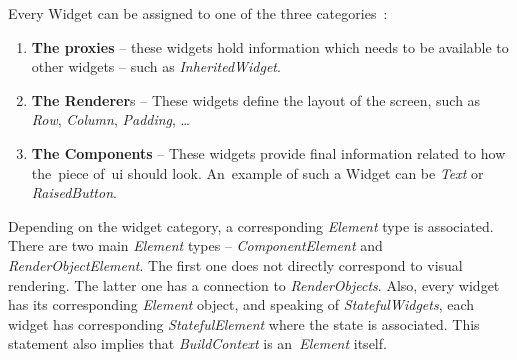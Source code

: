 Every Widget can be assigned to one of the three categories~\cite{didier-internals}:
\begin{enumerate}
\item \textbf{The proxies}  -- these widgets hold information which needs to be available to other widgets -- such as \textit{InheritedWidget}.
\item \textbf{The Renderer}s -- These widgets define the layout of the screen, such as \textit{Row}, \textit{Column}, \textit{Padding}, \ldots
\item \textbf{The Components} -- These widgets provide final information related to how the~piece of~\gls{ui} should look. An~example of such a Widget can be \textit{Text} or \textit{RaisedButton}. 
\end{enumerate}
Depending on the widget category, a corresponding \textit{Element} type is associated. There are two main \textit{Element} types -- \textit{ComponentElement} and \textit{RenderObjectElement}. The first one does not directly correspond to visual rendering. The latter one has a connection to \textit{RenderObjects}. Also, every widget has its corresponding \textit{Element} object, and speaking of \textit{StatefulWidgets}, each widget has corresponding \textit{StatefulElement} where the state is associated. This statement also implies that \textit{BuildContext} is an~\textit{Element} itself. 
